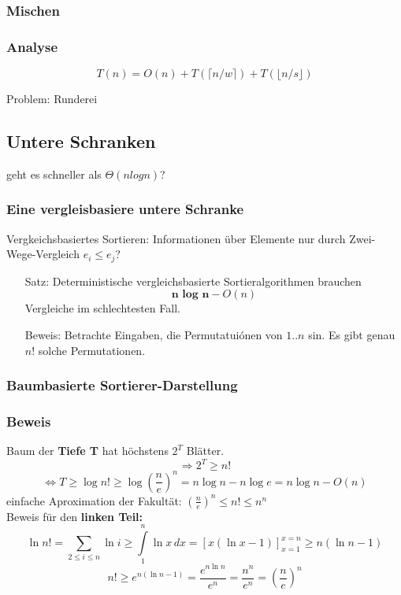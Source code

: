  \subsubsection*{Mischen}
  \subsubsection*{Analyse}
  \[T(n) = O(n) + T(\lceil n / w \rceil ) + T(\lfloor n / s \rfloor )\]

  Problem: Runderei

  \subsection{Untere Schranken}
  geht es schneller als $\Theta (n log n)$?

  \subsubsection*{Eine vergleisbasiere untere Schranke}
  Vergkeichsbasiertes Sortieren: Informationen über Elemente nur durch Zwei-Wege-Vergleich $e_i \leq e_j$? 
  \begin{itemize}
    \item [Satz: ] Deterministische vergleichsbasierte Sortieralgorithmen brauchen \[\textbf{n log n} - O(n)\] Vergleiche im schlechtesten Fall.
    \item [Beweis: ] Betrachte Eingaben, die Permutatuiónen von $1..n$ sin. Es gibt genau $n!$ solche Permutationen.
  \end{itemize}

  \subsubsection*{Baumbasierte Sortierer-Darstellung}

  \subsubsection*{Beweis}
  Baum der \textbf{Tiefe T} hat höchstens $2^T$ Blätter. \[\Rightarrow 2^T \geq n!\]\[\Leftrightarrow T \geq \log n! \geq \log (\frac{n}{e})^n = n \log n - n \log e = n \log n - O(n)\] einfache Aproximation der Fakultät: $(\frac{n}{e})^n \leq n! \leq n^n$ \\ Beweis für den \textbf{linken Teil:} \[\ln n ! = \sum\limits_{2 \leq i \leq n} \ln i \geq \int\limits_{1}^{n} \ln x \, dx = [x (\ln x - 1)]_{x = 1}^{x = n} \geq n(\ln n -1)\] \[n! \geq e^{n(\ln n - 1)} = \frac{e^{n\ln n}}{e^n} = \frac{n^n}{e^n} = (\frac{n}{e})^n\]

